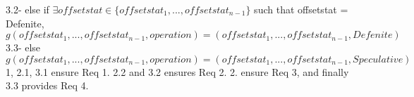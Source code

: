 \documentclass[a4paper, 11pt]{article}
\begin{document}
\hspace{ 8mm}
	3.2- else if $\exists offsetstat \in \{offsetstat_1, ..., offsetstat_{n-1}\}$ such that offsetstat = {Defenite},  $g(offsetstat_1, ...,  offsetstat_{n-1}, operation) = (offsetstat_1 ,..., offsetstat_{n-1}, Defenite)$\\

\hspace{ 8mm}
	3.3- else $g(offsetstat_1, ..., offsetstat_{n-1}, operation) = (offsetstat_1, ..., offsetstat_{n-1}, Speculative)$\\


1, 2.1, 3.1 ensure Req 1. 2.2 and 3.2 ensures Req 2. 2. ensure Req 3, and finally 3.3 provides Req 4.  












\end{document}
